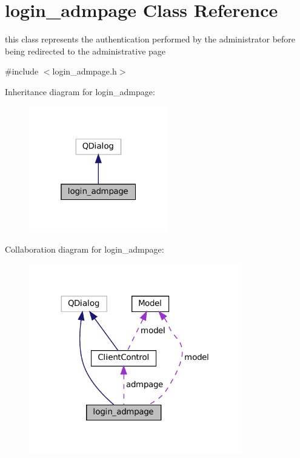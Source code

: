 \hypertarget{classlogin__admpage}{}\section{login\+\_\+admpage Class Reference}
\label{classlogin__admpage}


this class represents the authentication performed by the administrator before being redirected to the administrative page  




{\ttfamily \#include $<$login\+\_\+admpage.\+h$>$}



Inheritance diagram for login\+\_\+admpage\+:\nopagebreak
\begin{figure}[H]
\begin{center}
\leavevmode
\includegraphics[width=172pt]{classlogin__admpage__inherit__graph}
\end{center}
\end{figure}


Collaboration diagram for login\+\_\+admpage\+:\nopagebreak
\begin{figure}[H]
\begin{center}
\leavevmode
\includegraphics[width=263pt]{classlogin__admpage__coll__graph}
\end{center}
\end{figure}
